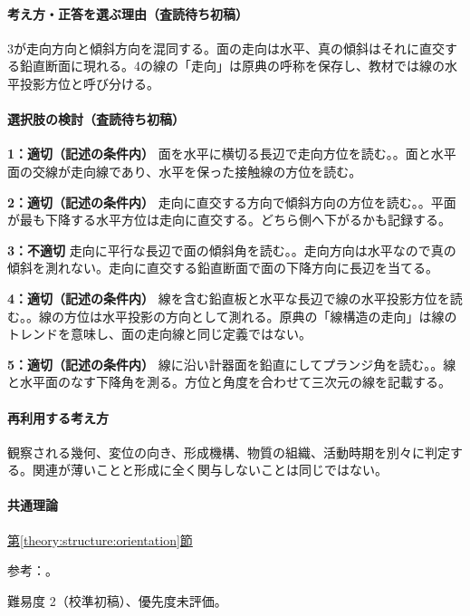 \paragraph{考え方・正答を選ぶ理由（査読待ち初稿）} 3が走向方向と傾斜方向を混同する。面の走向は水平、真の傾斜はそれに直交する鉛直断面に現れる。4の線の「走向」は原典の呼称を保存し、教材では線の水平投影方位と呼び分ける。

\paragraph{選択肢の検討（査読待ち初稿）}\mbox{}\par

\noindent\textbf{1：適切（記述の条件内）} 面を水平に横切る長辺で走向方位を読む。。面と水平面の交線が走向線であり、水平を保った接触線の方位を読む。\par

\noindent\textbf{2：適切（記述の条件内）} 走向に直交する方向で傾斜方向の方位を読む。。平面が最も下降する水平方位は走向に直交する。どちら側へ下がるかも記録する。\par

\noindent\textbf{3：不適切} 走向に平行な長辺で面の傾斜角を読む。。走向方向は水平なので真の傾斜を測れない。走向に直交する鉛直断面で面の下降方向に長辺を当てる。\par

\noindent\textbf{4：適切（記述の条件内）} 線を含む鉛直板と水平な長辺で線の水平投影方位を読む。。線の方位は水平投影の方向として測れる。原典の「線構造の走向」は線のトレンドを意味し、面の走向線と同じ定義ではない。\par

\noindent\textbf{5：適切（記述の条件内）} 線に沿い計器面を鉛直にしてプランジ角を読む。。線と水平面のなす下降角を測る。方位と角度を合わせて三次元の線を記載する。\par

\paragraph{再利用する考え方} 観察される幾何、変位の向き、形成機構、物質の組織、活動時期を別々に判定する。関連が薄いことと形成に全く関与しないことは同じではない。

\paragraph{共通理論} \hyperref[theory:structure:orientation]{第\ref*{theory:structure:orientation}節}

\par 参考：\cite{str_orientation}。

\par 難易度 2（校準初稿）、優先度未評価。
